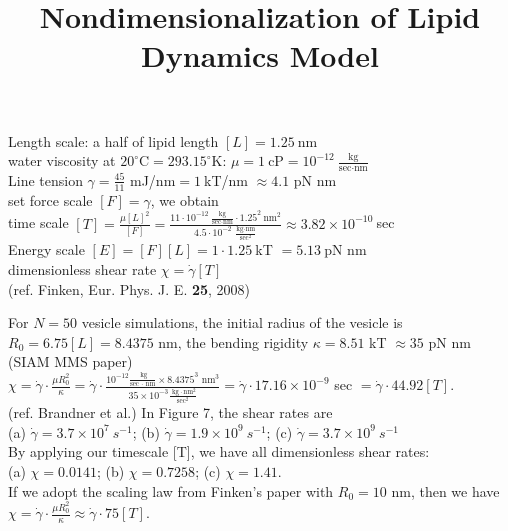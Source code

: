 \documentclass[12pt,letterpaper, onecolumn]{article}
\begin{document}
\topmargin=-100pt
\title{Nondimensionalization of Lipid Dynamics Model}
\maketitle

\Large
Length scale: a half of lipid length $[L]=1.25\ \text{nm}$\\

water viscosity at $20^\circ$C$=293.15^\circ$K: $\mu=1\ \text{cP}= 10^{-12}\ \frac{\text{kg}}{\text{sec}\cdot\text{nm}}$  \\

Line tension $\gamma=\frac{45}{11}$ mJ/nm$=1\ $kT/nm $\approx 4.1$ pN nm\\

set force scale $[F]=\gamma$, we obtain\\

time scale $\displaystyle [T] = \frac{\mu [L]^2}{[F]} = \frac{11\cdot 10^{-12}\ \frac{\text{kg}}{\text{sec}\cdot\text{nm}}\cdot 1.25^2\ \text{nm}^2}
{4.5\cdot10^{-2}\ \frac{\text{kg}\cdot\text{nm}}{\text{sec}^2}} 
\approx 3.82\times10^{-10}\ $sec\\

Energy scale $[E] = [F][L] = 1\cdot1.25\ $kT $= 5.13\ $pN nm\\


\newpage
dimensionless shear rate $\chi = \dot\gamma [T]$\\


(ref. Finken, Eur. Phys. J. E. {\bf 25}, 2008) 


For $N=50$ vesicle simulations, the initial radius of the vesicle is \\ $R_0=6.75 [L] = 8.4375$ nm, the bending rigidity $\kappa=8.51$ kT $\approx35$ pN nm (SIAM MMS paper)\\

\Large
$\chi = \dot\gamma \cdot\frac{\mu R_0^2}{\kappa} = \dot\gamma \cdot\frac{  10^{-12}\frac{\text{ kg}}{\text{sec $\cdot$ nm}} \times 8.4375^3 \text{ nm}^3}{ 35\times 10^{-3} \frac{\text{ kg}\cdot\text{nm}^2}{\text{sec}^2}} = \dot\gamma \cdot 17.16\times10^{-9}$ sec $ = \dot\gamma \cdot 44.92[T]$. \\


(ref. Brandner et al.)
In Figure 7, the shear rates are \\(a) $\dot\gamma = 3.7\times10^7\ s^{-1}$; (b) $\dot\gamma = 1.9\times10^9\ s^{-1}$; (c) $\dot\gamma = 3.7\times10^9\ s^{-1}$\\

By applying our timescale [T], we have all dimensionless shear rates: \\
(a) $\chi = 0.0141$; (b) $\chi = 0.7258$; (c) $\chi = 1.41$.\\


If we adopt the scaling law from Finken's paper with $R_0=10$ nm, then we have 
$\chi = \dot\gamma \cdot\frac{\mu R_0^2}{\kappa} \approx \dot\gamma \cdot 75[T]$. 
\end{document}
